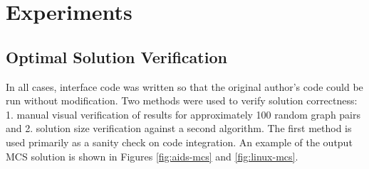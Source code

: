 \section{Experiments}
\subsection{Optimal Solution Verification}
In all cases, interface code was written so that the original author's code could be run without modification. Two methods were used to verify solution correctness: 1. manual visual verification of results for approximately 100 random graph pairs and 2. solution size verification against a second algorithm. The first method is used primarily as a sanity check on code integration. An example of the output MCS solution is shown in Figures \ref{fig:aids-mcs} and \ref{fig:linux-mcs}. 

